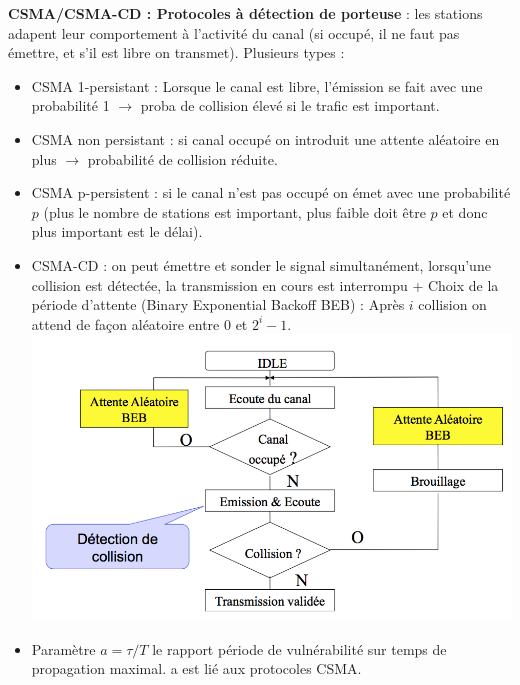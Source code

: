 \documentclass[a4paper,9pt, twocolumn]{article}
\begin{document}
	\textbf{CSMA/CSMA-CD : Protocoles à détection de porteuse} : les stations adapent leur comportement à l'activité du canal (si occupé, il ne faut pas émettre, et s'il est libre on transmet). Plusieurs types :
	\begin{itemize}
		\item CSMA 1-persistant : Lorsque le canal est libre, l'émission se fait avec une probabilité 1 $\longrightarrow$ proba de collision élevé si le trafic est important.
		\item CSMA non persistant : si canal occupé on introduit une attente aléatoire en plus $\longrightarrow$ probabilité de collision réduite.
		\item CSMA p-persistent : si le canal n'est pas occupé on émet avec une probabilité $p$ (plus le nombre de stations est important, plus faible doit être $p$ et donc plus important est le délai).
		\item CSMA-CD : on peut émettre et sonder le signal simultanément, lorsqu'une collision est détectée, la transmission en cours est interrompu + Choix de la période d'attente (Binary Exponential Backoff BEB) : Après $i$ collision on attend de façon aléatoire entre $0$ et $2^{i}-1$.
			\includegraphics[scale=0.4]{CD.png}
		\item Paramètre $a = \tau /T$ le rapport période de vulnérabilité sur temps de propagation maximal. a est lié aux protocoles CSMA.
	\end{itemize}
\end{document}
